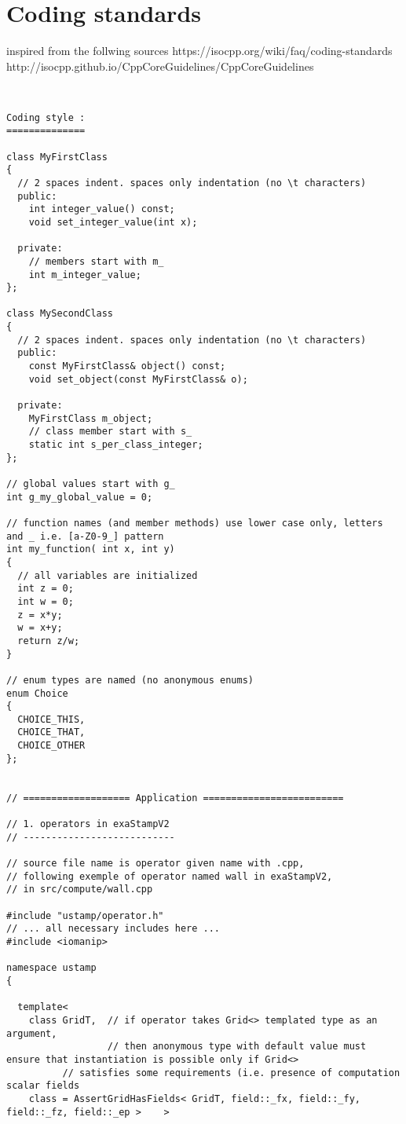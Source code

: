 \section{Coding standards}
\label{sec:coding_stabdards}


inspired from the follwing sources
https://isocpp.org/wiki/faq/coding-standards
http://isocpp.github.io/CppCoreGuidelines/CppCoreGuidelines

\begin{lstlisting}


Coding style :
==============

class MyFirstClass
{
  // 2 spaces indent. spaces only indentation (no \t characters)
  public:
    int integer_value() const;
    void set_integer_value(int x);

  private:
    // members start with m_
    int m_integer_value;
};

class MySecondClass
{
  // 2 spaces indent. spaces only indentation (no \t characters)
  public:
    const MyFirstClass& object() const;
    void set_object(const MyFirstClass& o);

  private:
    MyFirstClass m_object;
    // class member start with s_
    static int s_per_class_integer;
};

// global values start with g_
int g_my_global_value = 0;

// function names (and member methods) use lower case only, letters and _ i.e. [a-Z0-9_] pattern
int my_function( int x, int y)
{
  // all variables are initialized
  int z = 0;
  int w = 0;
  z = x*y;
  w = x+y;
  return z/w;
}

// enum types are named (no anonymous enums)
enum Choice
{
  CHOICE_THIS,
  CHOICE_THAT,
  CHOICE_OTHER
};


// =================== Application =========================

// 1. operators in exaStampV2
// ---------------------------

// source file name is operator given name with .cpp,
// following exemple of operator named wall in exaStampV2,
// in src/compute/wall.cpp

#include "ustamp/operator.h"
// ... all necessary includes here ...
#include <iomanip>

namespace ustamp
{

  template<
    class GridT,  // if operator takes Grid<> templated type as an argument,
                  // then anonymous type with default value must ensure that instantiation is possible only if Grid<>
		  // satisfies some requirements (i.e. presence of computation scalar fields
    class = AssertGridHasFields< GridT, field::_fx, field::_fy, field::_fz, field::_ep >    >


\end{lstlisting}
